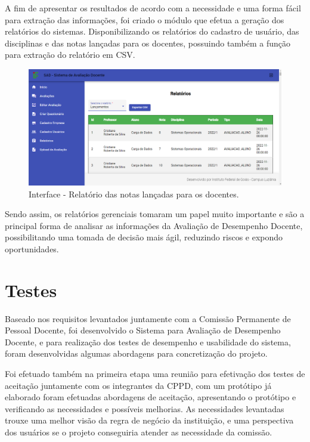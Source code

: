         A fim de apresentar os resultados de acordo com a necessidade e uma forma fácil para extração das informações, foi criado o módulo que efetua a geração dos relatórios do sistemas. Disponibilizando os relatórios do cadastro de usuário, das disciplinas e das notas lançadas para os docentes, possuindo também a função para extração do relatório em CSV.

        \begin{figure}[h]
        \centering
        \includegraphics[width=1.0\textwidth]{./img/relatorio.png}
        \caption{Interface - Relatório das notas lançadas para os docentes.}
        \label{fig:relatorio}
        \end{figure}

        Sendo assim, os relatórios gerenciais tomaram um papel muito importante e são a principal forma de analisar as informações da Avaliação de Desempenho Docente, possibilitando uma tomada de decisão mais ágil, reduzindo riscos e expondo oportunidades.

    
\section{Testes}

    Baseado nos requisitos levantados juntamente com a Comissão Permanente de Pessoal Docente, foi desenvolvido o Sistema para Avaliação de Desempenho Docente, e para realização dos testes de desempenho e usabilidade do sistema, foram desenvolvidas algumas abordagens para concretização do projeto.
        
    Foi efetuado também na primeira etapa uma reunião para efetivação dos testes de aceitação juntamente com os integrantes da CPPD, com um protótipo já elaborado foram efetuadas abordagens de aceitação, apresentando o protótipo e verificando as necessidades e possíveis melhorias. As necessidades levantadas trouxe uma melhor visão da regra de negócio da instituição, e uma perspectiva dos usuários se o projeto conseguiria atender as necessidade da comissão.  

